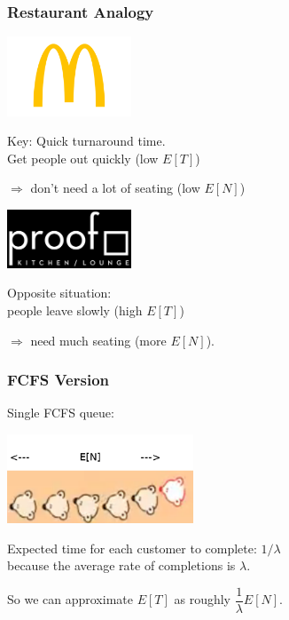 \begin{frame}
\frametitle{Restaurant Analogy}

\begin{minipage}{.49\textwidth}
\begin{center}
\includegraphics[width=10em]{images/McDonalds-Logo-500x319.png}
\end{center}

Key: Quick turnaround time. \\

Get people out quickly (low $E[T]$) 

$\Rightarrow$ don't need a lot of seating (low $E[N]$)
\end{minipage} \begin{minipage}{.49\textwidth}
\begin{center}
\includegraphics[width=10em]{images/proof-logo.png}
\end{center}

\begin{changemargin}{1em}
Opposite situation: \\

people leave slowly (high $E[T]$) 

$\Rightarrow$ need much seating (more $E[N]$). 
\end{changemargin}
\end{minipage}

\end{frame}



\begin{frame}
\frametitle{FCFS Version}

\large
\begin{changemargin}{2cm}
Single FCFS queue:

\begin{center}
\includegraphics[width=15em]{images/L33-queue.png}
\end{center}

Expected time for each customer to complete: $1/\lambda$\\
\qquad because the average rate of completions is $\lambda $. 

So we can approximate $E[T]$ as roughly $\dfrac{1}{\lambda}E[N]$.
\end{changemargin}

\end{frame}



